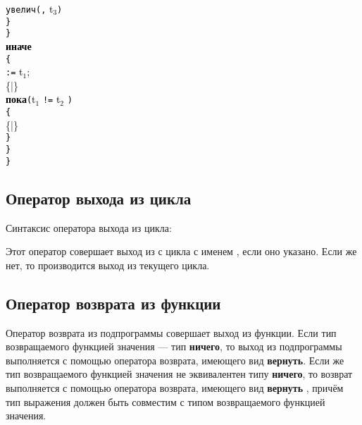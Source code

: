 \documentclass[10pt]{report}
\begin{document}
{{\phantom{конецмоимс}\textcolor{Black}{\texttt{увелич}}\textcolor{Black}{\texttt{(}}\textcolor{Black}{\texttt{,}} \textcolor{Black}{t$_3$}\textcolor{Black}{\texttt{)}}\\
\phantom{конец}\textcolor{Black}{\texttt{\}}}\\
\textcolor{Black}{\texttt{\}}}\\
\textcolor{Black}{\textbf{иначе}}\\
\textcolor{Black}{\texttt{\{}}\\
\phantom{конец} \textcolor{Black}{\texttt{:=}} \textcolor{Black}{t$_1$}\textcolor{Black}{;}\\
\phantom{конец}\{|\}\\
\phantom{конец}\textcolor{Black}{\textbf{пока}}\textcolor{Black}{\texttt{(}}\textcolor{Black}{t$_1$} \textcolor{Black}{\texttt{!=}} \textcolor{Black}{t$_2$}%
\textcolor{Black}{\texttt{)}}\\
\phantom{конец}\textcolor{Black}{\texttt{\{}}\\
\phantom{конецмоимс}\{|\}\\
\phantom{конец}\textcolor{Black}{\texttt{\}}}\\
\textcolor{Black}{\texttt{\}}}\\
\textcolor{Black}{\texttt{\}}}
}}

    \subsection{Оператор выхода из цикла}

Синтаксис оператора выхода из цикла:
\begin{center}
\textcolor{Green}{}
\end{center}
Этот оператор совершает выход из с цикла с именем \textcolor{Green}{}, если оно указано. Если же нет, то производится выход из текущего цикла.

    \subsection{Оператор возврата из функции}
Оператор возврата из подпрограммы совершает выход из функции. Если тип возвращаемого функцией значения --- тип \textbf{ничего}, то выход из подпрограммы выполняется
с помощью оператора возврата, имеющего вид \textbf{вернуть}. Если же тип возвращаемого функцией значения не эквивалентен типу \textbf{ничего}, то возврат выполняется
с помощью оператора возврата, имеющего вид \textbf{вернуть} \textcolor{Green}{}, причём тип выражения должен быть совместим с типом
возвращаемого функцией значения.
\end{document}
